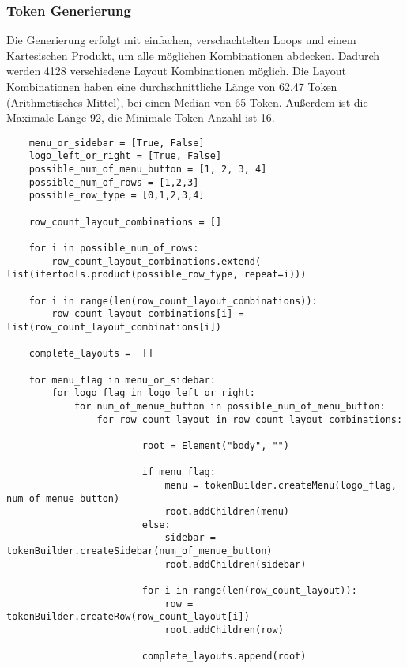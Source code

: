 \documentclass[pdftex,a4paper,halfparskip]{scrartcl}
\begin{document}
\subsubsection{Token Generierung}

Die Generierung erfolgt mit einfachen, verschachtelten Loops und einem Kartesischen Produkt, um alle möglichen Kombinationen abdecken. Dadurch werden 4128 verschiedene Layout Kombinationen möglich. 
Die Layout Kombinationen haben eine durchschnittliche Länge von 62.47 Token (Arithmetisches Mittel), bei einen Median von 65 Token. Außerdem ist die Maximale Länge 92, die Minimale Token Anzahl ist 16.

\begin{verbatim}
    menu_or_sidebar = [True, False]
    logo_left_or_right = [True, False]
    possible_num_of_menu_button = [1, 2, 3, 4]
    possible_num_of_rows = [1,2,3]
    possible_row_type = [0,1,2,3,4]

    row_count_layout_combinations = []

    for i in possible_num_of_rows:
        row_count_layout_combinations.extend( list(itertools.product(possible_row_type, repeat=i)))

    for i in range(len(row_count_layout_combinations)):
        row_count_layout_combinations[i] = list(row_count_layout_combinations[i])

    complete_layouts =  []

    for menu_flag in menu_or_sidebar:
        for logo_flag in logo_left_or_right:
            for num_of_menue_button in possible_num_of_menu_button:
                for row_count_layout in row_count_layout_combinations:

                        root = Element("body", "")

                        if menu_flag:
                            menu = tokenBuilder.createMenu(logo_flag, num_of_menue_button)
                            root.addChildren(menu)
                        else:
                            sidebar = tokenBuilder.createSidebar(num_of_menue_button)
                            root.addChildren(sidebar)

                        for i in range(len(row_count_layout)):
                            row = tokenBuilder.createRow(row_count_layout[i])
                            root.addChildren(row)

                        complete_layouts.append(root)
\end{verbatim}
\end{document}
